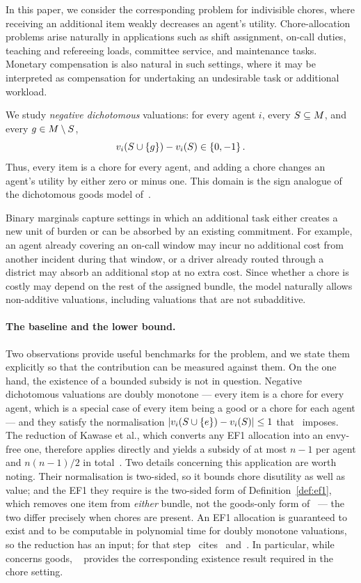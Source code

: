 In this paper, we consider the corresponding problem for indivisible chores, where receiving an additional item weakly decreases an agent's utility. Chore-allocation problems arise naturally in applications such as shift assignment, on-call duties, teaching and refereeing loads, committee service, and maintenance tasks. Monetary compensation is also natural in such settings, where it may be interpreted as compensation for undertaking an undesirable task or additional workload.

We study \emph{negative dichotomous} valuations: for every agent $i$, every $S\subseteq M$, and every $g\in M\setminus S$, \[ v_i(S\cup\left\{g\right\})-v_i(S)\in\left\{0,-1\right\}. \] Thus, every item is a chore for every agent, and adding a chore changes an agent's utility by either zero or minus one. This domain is the sign analogue of the dichotomous goods model of~\cite{BKNS22}.

Binary marginals capture settings in which an additional task either creates a new unit of burden or can be absorbed by an existing commitment. For example, an agent already covering an on-call window may incur no additional cost from another incident during that window, or a driver already routed through a district may absorb an additional stop at no extra cost. Since whether a chore is costly may depend on the rest of the assigned bundle, the model naturally allows non-additive valuations, including valuations that are not subadditive.

\paragraph{The baseline and the lower bound.}
Two observations provide useful benchmarks for the problem, and we state them explicitly so that the contribution can be measured against them. On the one hand, the existence of a bounded subsidy is not in question. Negative dichotomous valuations are doubly monotone --- every item is a chore for every
agent, which is a special case of every item being a good or a chore for each
agent --- and they satisfy the normalisation
$\left\lvert v_i(S \cup \left\{e\right\}) - v_i(S)\right\rvert \le 1$ that~\cite[\S2]{KMSTY24} imposes. The
reduction of Kawase et al., which converts any EF1 allocation into an envy-free
one, therefore applies directly and yields a subsidy of at most $n-1$ per
agent and $n(n-1)/2$ in total~\cite[Theorem~1]{KMSTY24}. Two details concerning this application are worth noting. Their normalisation is two-sided, so
it bounds chore disutility as well as value; and the EF1 they require is the
two-sided form of Definition~\ref{def:ef1}, which removes one item from
\emph{either} bundle, not the goods-only form
of~\cite{HS19} --- the two differ precisely when chores are present. An EF1
allocation is guaranteed to exist and to be computable in polynomial time for
doubly monotone valuations, so the reduction has an input; for that
step~\cite[\S2]{KMSTY24} cites~\cite{LMMS04} and~\cite{BSV21}. In particular, while ~\cite{LMMS04} concerns goods, ~\cite{BSV21} provides the corresponding existence result required in the chore setting.

